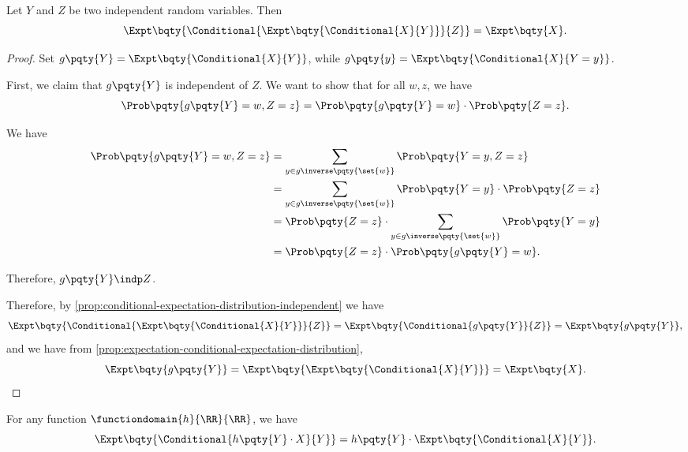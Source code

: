 \begin{proposition}
    \label{prop:conditional-expectation-independent-conditions}%
    Let \(Y\) and \(Z\) be two independent random variables. Then
    \[
        \Expt\bqty{\Conditional{\Expt\bqty{\Conditional{X}{Y}}}{Z}} = \Expt\bqty{X}.
    \]
\end{proposition}

\begin{proof}
    Set \(g\pqty{Y} = \Expt\bqty{\Conditional{X}{Y}}\), while \(g\pqty{y} = \Expt\bqty{\Conditional{X}{Y = y}}\).

    First, we claim that \(g\pqty{Y}\) is independent of \(Z\). We want to show that for all \(w, z\), we have
    \[
        \Prob\pqty{g\pqty{Y} = w, Z = z} = \Prob\pqty{g\pqty{Y} = w} \cdot \Prob\pqty{Z = z}.
    \]

    We have
    \begin{align*}
        \Prob\pqty{g\pqty{Y} = w, Z = z} &= \sum_{y \in g\inverse\pqty{\set{w}}} \Prob\pqty{Y = y, Z = z} \\
        &= \sum_{y \in g\inverse\pqty{\set{w}}} \Prob\pqty{Y = y} \cdot \Prob\pqty{Z = z} \\
        &= \Prob\pqty{Z = z} \cdot \sum_{y \in g\inverse\pqty{\set{w}}} \Prob\pqty{Y = y} \\
        &= \Prob\pqty{Z = z} \cdot \Prob\pqty{g\pqty{Y} = w}.
    \end{align*}

    Therefore, \(g\pqty{Y} \indp Z\).

    Therefore, by \autoref{prop:conditional-expectation-distribution-independent} we have
    \[
        \Expt\bqty{\Conditional{\Expt\bqty{\Conditional{X}{Y}}}{Z}} = \Expt\bqty{\Conditional{g\pqty{Y}}{Z}} = \Expt\bqty{g\pqty{Y}},
    \]
    and we have from \autoref{prop:expectation-conditional-expectation-distribution},
    \[
        \Expt\bqty{g\pqty{Y}} = \Expt\bqty{\Expt\bqty{\Conditional{X}{Y}}} = \Expt\bqty{X}.
    \]
\end{proof}

\begin{proposition}
    \label{prop:extraction-function-condition}%
    For any function \(\functiondomain{h}{\RR}{\RR}\), we have
    \[
        \Expt\bqty{\Conditional{h\pqty{Y} \cdot X}{Y}} = h\pqty{Y} \cdot \Expt\bqty{\Conditional{X}{Y}}.
    \]
\end{proposition}

